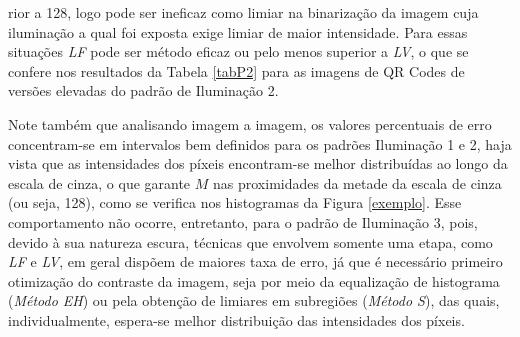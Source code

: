 \documentclass{ceel}
\begin{document}
\begin{multicols}{2}
\begin{minipage}[h]{\columnwidth}
\vspace{-0.1cm}
\caption{Imagens resultantes da Binarização em Sub-regiões para o QR Code 3 nos padrões de (a) Iluminação 1, (c) Iluminação 2 e (e) Iluminação 3, com suas respectivas imagens diferença em (b), (d) e (f).} \label{figS}
\end{minipage}

\vspace{0.95cm}
\noindent rior a 128, logo pode ser ineficaz como limiar na binarização da imagem cuja iluminação a qual foi exposta exige limiar de maior intensidade. Para essas situações \emph{LF} pode ser método eficaz ou pelo menos superior a \emph{LV}, o que se confere nos resultados da Tabela \ref{tabP2} para as imagens de QR Codes de versões elevadas do padrão de Iluminação 2.

Note também que analisando imagem a imagem, os valores percentuais de erro concentram-se em intervalos bem definidos para os padrões Iluminação 1 e 2, haja vista que as intensidades dos píxeis encontram-se melhor distribuídas ao longo da escala de cinza, o que garante $M$ nas proximidades da metade da escala de cinza (ou seja, 128), como se verifica nos histogramas da Figura \ref{exemplo}. Esse comportamento não ocorre, entretanto, para o padrão de Iluminação 3, pois, devido à sua natureza escura, técnicas que envolvem somente uma etapa, como \emph{LF} e \emph{LV}, em geral dispõem de maiores taxa de erro, já que é necessário primeiro otimização do contraste da imagem, seja por meio da equalização de histograma (\emph{Método EH}) ou pela obtenção de limiares em subregiões (\emph{Método S}), das quais, individualmente, espera-se melhor distribuição das intensidades dos píxeis.

\end{multicols}
\end{document}
